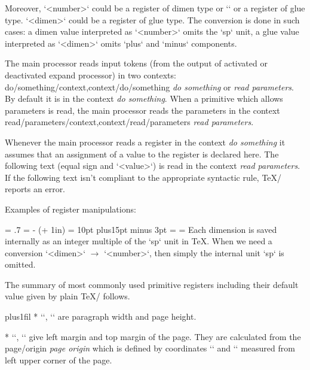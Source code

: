 {\removelastskip
Moreover, `<number>` could be a register of dimen type or `\dimexpr`
or a register of glue type. `<dimen>` could be a register of glue type.
The conversion is done in such cases: a dimen value interpreted as
`<number>` omits the `sp` unit, a glue value interpreted as `<dimen>`
omits `plus` and `minus` components.

The main processor reads input tokens (from the output of activated or
deactivated expand processor) in two contexts: 
\ii do/something/context,context/do/something {\em do something} or {\em
read parameters}. By default it is in the context {\em do something}. When a
primitive which allows parameters is read, the main processor reads the
parameters in the context \ii read/parameters/context,context/read/parameters {\em read parameters}.

Whenever the main processor reads a register in the context
{\em do something} it assumes that an assignment of a value to the register
is declared here. The following text (equal sign and `<value>`) is read in the context
{\em read parameters}. If the following text isn't
compliant to the appropriate syntactic rule, \TeX/ reports an error.

Examples of register manipulations:

\begtt
\newcount\mynumber \newdimen\mydimen \newdimen\myskip
\hsize = .7\hsize  %
\hoffset = \dimexpr 10mm - (\parindent + 1in) \relax %
\myskip = 10pt plus15pt minus 3pt
\mydimen = \myskip    %
\mynumber = \mydimen  %
\endtt
%
Each dimension is saved internally as an integer multiple of the `sp` unit in
\TeX. When we need a conversion `<dimen>` $\to$ `<number>`, then simply the
internal unit `sp` is omitted.

The summary of most commonly used primitive registers including their default
value given by plain \TeX/ follows.

\let\makedest=\makedestactive

\begitems  \rightskip=0pt plus1fil
* \y`\hsize=6.5in`,
  \y`\vsize=8.9in`
  are paragraph width and page height.

* \y`\hoffset=0pt`,
  \y`\voffset=0pt` give left margin and top margin of the page. They are
  calculated from the \ii page/origin {\em page origin} which is defined by coordinates
  \y`\pdfvorigin=1in` and \y`\pdfhorigin=1in` measured from left upper corner of
  the page.

}
